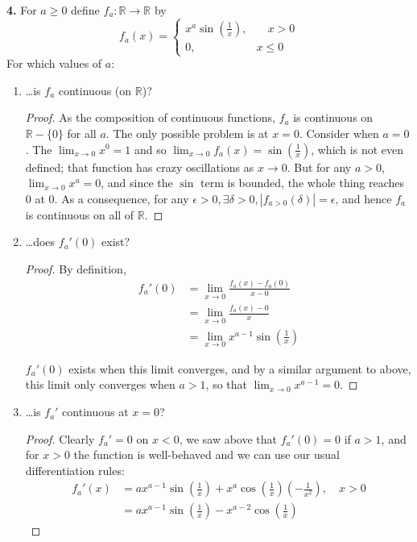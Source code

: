 \documentclass{article}
\newcommand{\R}{\mathbb{R}}
\newcommand{\abs}[1]{\left| #1 \right|}
\newcommand{\paren}[1]{\left( #1 \right)}
\newcommand{\problem}[1]{\noindent \textbf{#1}}
\begin{document}

\problem{4. }
For $a \ge 0$ define $f_a : \R \to \R$ by
$$f_a(x) = \begin{cases}
    x^a \sin\paren{\frac{1}{x}}, & \quad x > 0 \\
    0, & x \le 0
\end{cases}$$
For which values of $a$:
\begin{enumerate}
    \item \dots is $f_a$ continuous (on $\R$)?
    \begin{proof}
        As the composition of continuous functions, $f_a$ is continuous on $\R - \{0\}$ for all $a$. The only possible problem is at $x = 0$. Consider when $a = 0$. The $\lim_{x \to 0 } x^0 = 1$ and so $\lim_{x \to 0} f_a(x) = \sin\paren{\frac{1}{x}}$, which is not even defined; that function has crazy oscillations as $x \to 0$. But for any $a > 0$, $\lim_{x \to 0} x^a = 0$, and since the $\sin$ term is bounded, the whole thing reaches $0$ at $0$. As a consequence, for any $\epsilon > 0,\exists \delta > 0, \abs{f_{a > 0}(\delta)} = \epsilon$, and hence $f_a$ is continuous on all of $\R$.
    \end{proof}
    
    \item \dots does $f_a'(0)$ exist?
    \begin{proof}
        By definition,
        \begin{align*}
            f_a'(0) &= \lim_{x \to 0} \frac{f_a(x) - f_a(0)}{x - 0} \\
            &= \lim_{x \to 0} \frac{f_a(x) - 0}{x} \\
            &= \lim_{x \to 0} x^{a - 1} \sin\paren{\frac{1}{x}}            
        \end{align*}

        $f_a'(0)$ exists when this limit converges, and by a similar argument to above, this limit only converges when $a > 1$, so that $\lim_{x \to 0} x^{a - 1} = 0$.
    \end{proof}

    \item \dots is $f_a'$ continuous at $x = 0$?
    \begin{proof}
        Clearly $f_a' = 0$ on $x < 0$, we saw above that $f_a'(0) = 0$ if $a > 1$, and for $x > 0$ the function is well-behaved and we can use our usual differentiation rules:
        \begin{align*}
            f_a'(x) &= ax^{a - 1}\sin\paren{\frac{1}{x}} + x^a \cos\paren{\frac{1}{x}}\paren{-\frac{1}{x^2}}, \quad x > 0 \\
            &= ax^{a - 1}\sin\paren{\frac{1}{x}} - x^{a - 2} \cos\paren{\frac{1}{x}}
        \end{align*}


\end{proof}
\end{enumerate}
\end{document}

